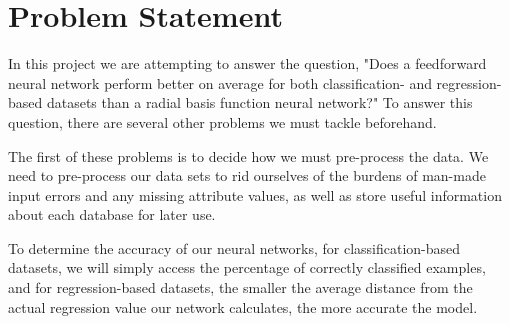 \documentclass[twoside,11pt]{article}
\begin{document}

\section{Problem Statement}
In this project we are attempting to answer the question, "Does a feedforward neural network perform better on average for both classification- and regression-based datasets than a radial basis function neural network?" To answer this question, there are several other problems we must tackle beforehand.

The first of these problems is to decide how we must pre-process the data. We need to pre-process our data sets to rid ourselves of the burdens of man-made input errors and any missing attribute values, as well as store useful information about each database for later use.

To determine the accuracy of our neural networks, for classification-based datasets, we will simply access the percentage of correctly classified examples, and for regression-based datasets, the smaller the average distance from the actual regression value our network calculates, the more accurate the model.





\end{document}
